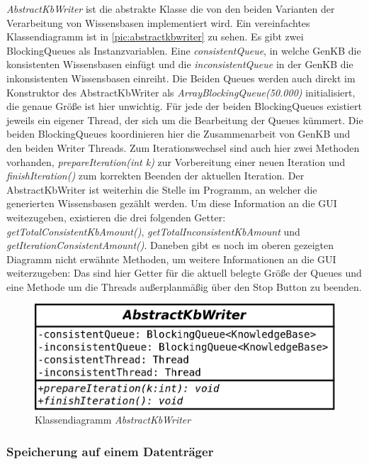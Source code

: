 \documentclass[12pt,a4paper]{article}
\begin{document}
\textit{AbstractKbWriter} ist die abstrakte Klasse die von den beiden Varianten der Verarbeitung von Wissensbasen implementiert wird. Ein vereinfachtes Klassendiagramm ist in \autoref{pic:abstractkbwriter} zu sehen. Es gibt zwei BlockingQueues als Instanzvariablen. Eine \textit{consistentQueue}, in welche GenKB die konsistenten Wissensbasen einfügt und die \textit{inconsistentQueue} in der GenKB die inkonsistenten Wissensbasen einreiht. Die Beiden Queues werden auch direkt im Konstruktor des AbstractKbWriter als  \textit{ArrayBlockingQueue(50.000)} initialisiert, die genaue Größe ist hier unwichtig. Für jede der beiden BlockingQueues existiert jeweils ein eigener Thread, der sich um die Bearbeitung der Queues kümmert. Die beiden BlockingQueues koordinieren hier die Zusammenarbeit von GenKB und den beiden Writer Threads. Zum Iterationswechsel sind auch hier zwei Methoden vorhanden, \textit{prepareIteration(int k)} zur Vorbereitung einer neuen Iteration und \textit{finishIteration()} zum korrekten Beenden der aktuellen Iteration. Der AbstractKbWriter ist weiterhin die Stelle im Programm, an welcher die generierten Wissensbasen gezählt werden. Um diese Information an die GUI weitezugeben, existieren die drei folgenden Getter: \textit{getTotalConsistentKbAmount()}, \textit{getTotalInconsistentKbAmount} und \textit{getIterationConsistentAmount()}.
Daneben gibt es noch im  oberen gezeigten Diagramm nicht erwähnte Methoden, um weitere Informationen an die GUI weiterzugeben: Das sind hier Getter für die aktuell belegte Größe der Queues und eine Methode um die Threads außerplanmäßig über den Stop Button zu beenden.


\begin{figure}
\includegraphics[width=0.55\linewidth]{bilder/AbstractKbWriter.png}
\caption{Klassendiagramm \textit{AbstractKbWriter}}
\label{pic:abstractkbwriter}
\end{figure}

\subsubsection{Speicherung auf einem Datenträger}
\label{sec:kbfilewriter}
\end{document}
